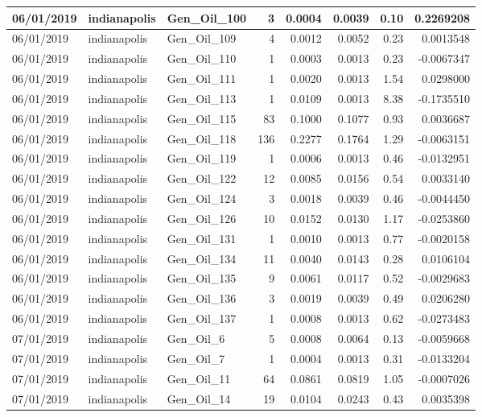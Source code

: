 \documentclass[
  letterpaper,
  DIV=11,
  numbers=noendperiod]{scrartcl}
\begin{document}
\begin{tabular}{l|l|l|r|r|r|r|r}
\hline
06/01/2019 & indianapolis & Gen\_Oil\_100 & 3 & 0.0004 & 0.0039 & 0.10 & 0.2269208\\
\hline
06/01/2019 & indianapolis & Gen\_Oil\_109 & 4 & 0.0012 & 0.0052 & 0.23 & 0.0013548\\
\hline
06/01/2019 & indianapolis & Gen\_Oil\_110 & 1 & 0.0003 & 0.0013 & 0.23 & -0.0067347\\
\hline
06/01/2019 & indianapolis & Gen\_Oil\_111 & 1 & 0.0020 & 0.0013 & 1.54 & 0.0298000\\
\hline
06/01/2019 & indianapolis & Gen\_Oil\_113 & 1 & 0.0109 & 0.0013 & 8.38 & -0.1735510\\
\hline
06/01/2019 & indianapolis & Gen\_Oil\_115 & 83 & 0.1000 & 0.1077 & 0.93 & 0.0036687\\
\hline
06/01/2019 & indianapolis & Gen\_Oil\_118 & 136 & 0.2277 & 0.1764 & 1.29 & -0.0063151\\
\hline
06/01/2019 & indianapolis & Gen\_Oil\_119 & 1 & 0.0006 & 0.0013 & 0.46 & -0.0132951\\
\hline
06/01/2019 & indianapolis & Gen\_Oil\_122 & 12 & 0.0085 & 0.0156 & 0.54 & 0.0033140\\
\hline
06/01/2019 & indianapolis & Gen\_Oil\_124 & 3 & 0.0018 & 0.0039 & 0.46 & -0.0044450\\
\hline
06/01/2019 & indianapolis & Gen\_Oil\_126 & 10 & 0.0152 & 0.0130 & 1.17 & -0.0253860\\
\hline
06/01/2019 & indianapolis & Gen\_Oil\_131 & 1 & 0.0010 & 0.0013 & 0.77 & -0.0020158\\
\hline
06/01/2019 & indianapolis & Gen\_Oil\_134 & 11 & 0.0040 & 0.0143 & 0.28 & 0.0106104\\
\hline
06/01/2019 & indianapolis & Gen\_Oil\_135 & 9 & 0.0061 & 0.0117 & 0.52 & -0.0029683\\
\hline
06/01/2019 & indianapolis & Gen\_Oil\_136 & 3 & 0.0019 & 0.0039 & 0.49 & 0.0206280\\
\hline
06/01/2019 & indianapolis & Gen\_Oil\_137 & 1 & 0.0008 & 0.0013 & 0.62 & -0.0273483\\
\hline
07/01/2019 & indianapolis & Gen\_Oil\_6 & 5 & 0.0008 & 0.0064 & 0.13 & -0.0059668\\
\hline
07/01/2019 & indianapolis & Gen\_Oil\_7 & 1 & 0.0004 & 0.0013 & 0.31 & -0.0133204\\
\hline
07/01/2019 & indianapolis & Gen\_Oil\_11 & 64 & 0.0861 & 0.0819 & 1.05 & -0.0007026\\
\hline
07/01/2019 & indianapolis & Gen\_Oil\_14 & 19 & 0.0104 & 0.0243 & 0.43 & 0.0035398\\

\end{tabular}
\end{document}
